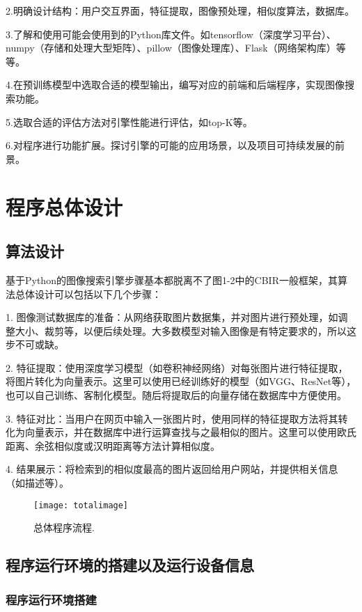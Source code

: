 \documentclass[bachelor_p]{hdu-thesis}
\begin{document}
2.明确设计结构：用户交互界面，特征提取，图像预处理，相似度算法，数据库。

3.了解和使用可能会使用到的Python库文件。如tensorflow（深度学习平台）、numpy（存储和处理大型矩阵）、pillow（图像处理库）、Flask（网络架构库）等等。

4.在预训练模型中选取合适的模型输出，编写对应的前端和后端程序，实现图像搜索功能。

5.选取合适的评估方法对引擎性能进行评估，如top-K等。

6.对程序进行功能扩展。探讨引擎的可能的应用场景，以及项目可持续发展的前景。


\chapter{程序总体设计}

\section{算法设计}

基于Python的图像搜索引擎步骤基本都脱离不了图1-2中的CBIR一般框架，其算法总体设计可以包括以下几个步骤：

1. 图像测试数据库的准备：从网络获取图片数据集，并对图片进行预处理，如调整大小、裁剪等，以便后续处理。大多数模型对输入图像是有特定要求的，所以这步不可或缺。

2. 特征提取：使用深度学习模型（如卷积神经网络）对每张图片进行特征提取，将图片转化为向量表示。这里可以使用已经训练好的模型（如VGG、ResNet等），也可以自己训练、客制化模型。随后将提取后的向量存储在数据库中方便使用。

3. 特征对比：当用户在网页中输入一张图片时，使用同样的特征提取方法将其转化为向量表示，并在数据库中进行运算查找与之最相似的图片。这里可以使用欧氏距离、余弦相似度或汉明距离等方法计算相似度。

4. 结果展示：将检索到的相似度最高的图片返回给用户网站，并提供相关信息（如描述等）。

\begin{figure}[!htb]
  \centering
  \texttt{[image: totalimage]}
  \caption{总体程序流程.}
  \label{fig_totalimage}
\end{figure}

\section{程序运行环境的搭建以及运行设备信息}

\subsection{程序运行环境搭建}
\end{document}
